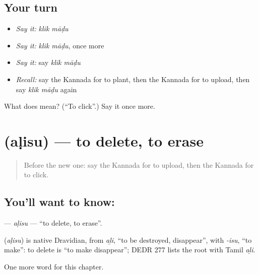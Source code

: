 \subsection*{Your turn}
\begin{itemize}
\raggedright
  \item \emph{Say it:} \emph{klik māḍu}
  \item \emph{Say it:} \emph{klik māḍu}, once more
  \item \emph{Say it:} say \emph{klik māḍu}
  \item \emph{Recall:} say the Kannada for to plant, then the Kannada for to upload, then say \emph{klik māḍu} again
\end{itemize}

\begin{tcolorbox}[breakable,colback=teal!4,colframe=teal!35!black,title={Before you move on}]
What does   mean? (\textquotedblleft{}To click\textquotedblright{}.) Say it once more.
\end{tcolorbox}
\section[\texorpdfstring{\kn{ಅಳಿಸು} (aḷisu)}{ಅಳಿಸು (aḷisu)}]{ (aḷisu) — to delete, to erase}

\label{lesson:KA-C164-alisu}



\begin{quote}
Before the new one: say the Kannada for to upload, then the Kannada for to click.
\end{quote}

\subsection*{You'll want to know: }
\textbf{} — \emph{aḷisu} — \textquotedblleft{}to delete, to erase\textquotedblright{}.

\begin{cousinweb}
\textbf{} (\emph{aḷisu}) is native Dravidian, from \emph{aḻi}, \textquotedblleft{}to be destroyed, disappear\textquotedblright{}, with \emph{-isu}, \textquotedblleft{}to make\textquotedblright{}: to delete is \textquotedblleft{}to make disappear\textquotedblright{}; DEDR 277 lists the root with Tamil \emph{aḻi}.
\end{cousinweb}

\begin{grammarlens}[title={What you've built}]
One more word for this chapter.
\end{grammarlens}


